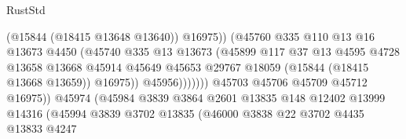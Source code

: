 \begin{lexlean}{RustStd}
\begin{coremodule}
                                                (@15844 (@18415 @13648 @13640))
                                                @16975))
                                            (@45760
                                              @335
                                              @110
                                              @13
                                              @16
                                              @13673
                                              @4450
                                              (@45740
                                                @335
                                                @13
                                                @13673
                                                (@45899
                                                  @117
                                                  @37
                                                  @13
                                                  @4595
                                                  @4728
                                                  @13658
                                                  @13668
                                                  @45914
                                                  @45649
                                                  @45653
                                                  @29767
                                                  @18059
                                                  (@15844 (@18415 @13668 @13659))
                                                  @16975))
                                              @45956)))))))
                                @45703
                                @45706
                                @45709
                                @45712
                                @16975))
                            @45974
                            (@45984
                              @3839
                              @3864
                              @2601
                              @13835
                              @148
                              @12402
                              @13999
                              @14316
                              (@45994
                                @3839
                                @3702
                                @13835
                                (@46000
                                  @3838
                                  @22
                                  @3702
                                  @4435
                                  @13833
                                  @4247

\end{coremodule}
\end{lexlean}
